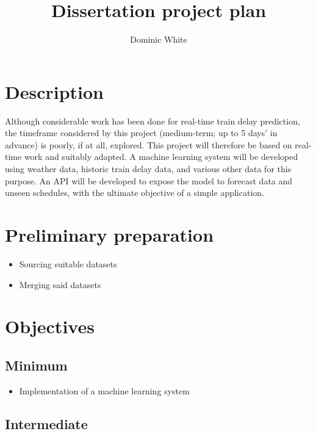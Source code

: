\documentclass[11pt]{article} %
\title{Dissertation project plan}
\author{Dominic White}
\begin{document}
\maketitle

\section*{Description}

Although considerable work has been done for real-time train delay prediction, the timeframe considered by this project (medium-term; up to 5 days’ in advance) is poorly, if at all, explored. This project will therefore be based on real-time work and suitably adapted. A machine learning system will be developed using weather data, historic train delay data, and various other data for this purpose. An API will be developed to expose the model to forecast data and unseen schedules, with the ultimate objective of a simple application.

\section*{Preliminary preparation}

\begin{itemize}

	\item{Sourcing suitable datasets}
	\item{Merging said datasets}

\end{itemize}

\section*{Objectives}

\subsection*{Minimum}

\begin{itemize}

	\item{Implementation of a machine learning system}

\end{itemize}

\subsection*{Intermediate}
\end{document}
